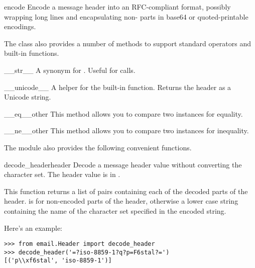 \begin{methoddesc}[Header]{encode}{}
Encode a message header into an RFC-compliant format, possibly
wrapping long lines and encapsulating non-\ASCII{} parts in base64 or
quoted-printable encodings.
\end{methoddesc}

The  class also provides a number of methods to support
standard operators and built-in functions.

\begin{methoddesc}[Header]{__str__}{}
A synonym for .  Useful for
 calls.
\end{methoddesc}

\begin{methoddesc}[Header]{__unicode__}{}
A helper for the built-in  function.  Returns the
header as a Unicode string.
\end{methoddesc}

\begin{methoddesc}[Header]{__eq__}{other}
This method allows you to compare two  instances for equality.
\end{methoddesc}

\begin{methoddesc}[Header]{__ne__}{other}
This method allows you to compare two  instances for inequality.
\end{methoddesc}

The  module also provides the following
convenient functions.

\begin{funcdesc}{decode_header}{header}
Decode a message header value without converting the character set.
The header value is in .

This function returns a list of  pairs
containing each of the decoded parts of the header.   is
 for non-encoded parts of the header, otherwise a lower
case string containing the name of the character set specified in the
encoded string.

Here's an example:

\begin{verbatim}
>>> from email.Header import decode_header
>>> decode_header('=?iso-8859-1?q?p=F6stal?=')
[('p\\xf6stal', 'iso-8859-1')]
\end{verbatim}
\end{funcdesc}

